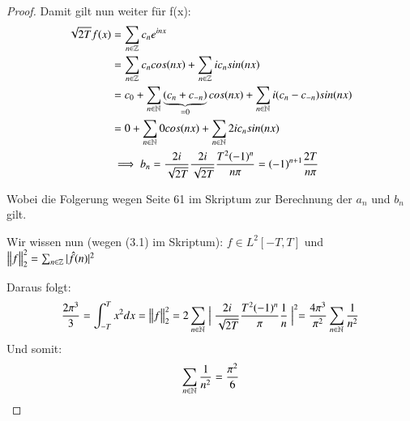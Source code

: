 \begin{proof}
	Damit gilt nun weiter für f(x):
	\begin{equation*}
	\begin{split}
	\sqrt{2T} f(x) & = \sum_{n \in \mathbb{Z}} c_n e^{inx} \\
	& = \sum_{n \in \mathbb{Z}} c_n cos(nx) + \sum_{n \in \mathbb{Z}} i c_n sin(nx) \\
	& = c_0 + \sum_{n \in \mathbb{N}} \underbrace{(c_n + c_{-n})}_{=0} cos(nx) + \sum_{n \in \mathbb{N}} i (c_n - c_{-n}) sin(nx) \\
	& = 0 + \sum_{n \in \mathbb{N}} 0 cos(nx) + \sum_{n \in \mathbb{N}} 2i c_n sin(nx) \\
	& \implies b_n = \frac{2i}{\sqrt{2T}} \frac{2i}{\sqrt{2T}} \frac{T^2 (-1)^n}{n\pi} = (-1)^{n+1} \frac{2T}{n\pi}
	\end{split}
	\end{equation*}
	
	Wobei die Folgerung wegen Seite 61 im Skriptum zur Berechnung der $a_n$ und $b_n$ gilt.
	
	Wir wissen nun (wegen (3.1) im Skriptum): $f \in L^2[-T, T]$ und $\left\lVert f\right\rVert_2^2 = \sum_{n \in \mathbb{Z}} |\hat{f}(n)|^2$
	
	Daraus folgt:
	\begin{equation*}
	\frac{2\pi^3}{3} = \int_{-T}^{T} x^2 dx = \left\lVert f\right\rVert_2^2 = 2 \sum_{n \in \mathbb{N}} \Bigm\lvert \frac{2i}{\sqrt{2T}} \frac{T^2 (-1)^n}{\pi} \frac{1}{n} \Bigm\lvert^2 = \frac{4 \pi^3}{\pi^2} \sum_{n \in \mathbb{N}} \frac{1}{n^2}
	\end{equation*}
	Und somit:
	\begin{equation*}
	\sum_{n \in \mathbb{N}} \frac{1}{n^2} = \frac{\pi^2}{6}
	\end{equation*}
\end{proof}
